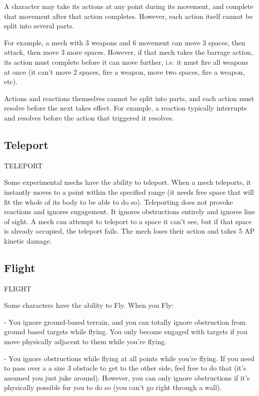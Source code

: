 A character may take its actions at any point during its movement, and complete that movement
after that action completes. However, each action itself cannot be split into several parts.

For example, a mech with 3 weapons and 6 movement can move 3 spaces, then attack, then
move 3 more spaces. However, if that mech takes the barrage action, its action must complete
before it can move further, i.e. it must fire all weapons at once (it can’t move 2 spaces, fire a
weapon, move two spaces, fire a weapon, etc).

Actions and reactions themselves cannot be split into parts, and each action must resolve before
the next takes effect. For example, a reaction typically interrupts and resolves before the action
that triggered it resolves.

\subsection{Teleport}
                                                TELEPORT

Some experimental mechs have the ability to teleport. When a mech teleports, it instantly moves
to a point within the specified range (it needs free space that will fit the whole of its body to be
able to do so). Teleporting does not provoke reactions and ignores engagement. It ignores
obstructions entirely and ignores line of sight. A mech can attempt to teleport to a space it can’t
see, but if that space is already occupied, the teleport fails. The mech loses their action and takes
5 AP kinetic damage.

\subsection{Flight}
                                                   FLIGHT

Some characters have the ability to Fly. When you Fly:




    -    You ignore ground-based terrain, and you can totally ignore obstruction from ground
         based targets while flying. You only become engaged with targets if you move physically
         adjacent to them while you’re flying.

    -    You ignore obstructions while flying at all points while you’re flying. If you need to pass
         over a a size 3 obstacle to get to the other side, feel free to do that (it’s assumed you just
         juke around). However, you can only ignore obstructions if it’s physically possible for you
         to do so (you can’t go right through a wall).

